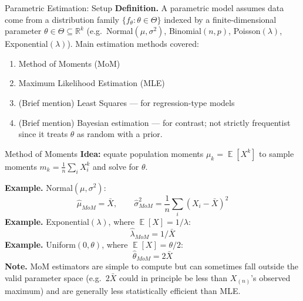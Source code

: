 \documentclass[11pt,aspectratio=169]{beamer}
\newcommand{\E}{\operatorname{\mathbb{E}}}
\newcommand{\Xbar}{\bar{X}}
\newcommand{\Def}[1]{\textbf{Definition.} #1}
\newcommand{\Note}[1]{\textbf{Note.} #1}
\newcommand{\Ex}[1]{\textbf{Example.} #1}
\begin{document}
\begin{frame}{Parametric Estimation: Setup}
\Def{A parametric model assumes data come from a distribution family
$\{f_\theta:\theta\in\Theta\}$ indexed by a finite-dimensional parameter
$\theta\in\Theta\subseteq\mathbb R^k$ (e.g.\ Normal$(\mu,\sigma^2)$,
Binomial$(n,p)$, Poisson$(\lambda)$, Exponential$(\lambda)$).}
Main estimation methods covered:
\begin{enumerate}
    \item Method of Moments (MoM)
    \item Maximum Likelihood Estimation (MLE)
    \item (Brief mention) Least Squares — for regression-type models
    \item (Brief mention) Bayesian estimation — for contrast; not strictly
          frequentist since it treats $\theta$ as random with a prior.
\end{enumerate}
\end{frame}

\begin{frame}{Method of Moments}
\textbf{Idea:} equate population moments $\mu_k=\E[X^k]$ to sample moments
$m_k=\frac1n\sum_i X_i^k$ and solve for $\theta$.

\Ex{Normal$(\mu,\sigma^2)$:}
\[
    \hat\mu_{MoM}=\Xbar, \qquad
    \hat\sigma^2_{MoM}=\frac1n\sum_i (X_i-\Xbar)^2
\]
\Ex{Exponential$(\lambda)$, where $\E[X]=1/\lambda$:}
\[
    \hat\lambda_{MoM}=1/\Xbar
\]
\Ex{Uniform$(0,\theta)$, where $\E[X]=\theta/2$:}
\[
    \hat\theta_{MoM}=2\Xbar
\]
\Note{MoM estimators are simple to compute but can sometimes fall outside
the valid parameter space (e.g.\ $2\Xbar$ could in principle be less than
$X_{(n)}$'s observed maximum) and are generally less statistically
efficient than MLE.}
\end{frame}
\end{document}
